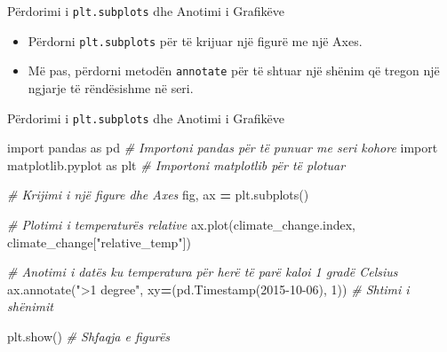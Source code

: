 \documentclass[
  ignorenonframetext,
]{beamer}
\newenvironment{Shaded}{\begin{snugshade}}{\end{snugshade}}
\newcommand{\CommentTok}[1]{\textcolor[rgb]{0.56,0.35,0.01}{\textit{#1}}}
\newcommand{\DecValTok}[1]{\textcolor[rgb]{0.00,0.00,0.81}{#1}}
\newcommand{\ImportTok}[1]{#1}
\newcommand{\NormalTok}[1]{#1}
\newcommand{\OperatorTok}[1]{\textcolor[rgb]{0.81,0.36,0.00}{\textbf{#1}}}
\newcommand{\StringTok}[1]{\textcolor[rgb]{0.31,0.60,0.02}{#1}}
\begin{document}
\begin{frame}[fragile]{Përdorimi i \texttt{plt.subplots} dhe Anotimi i
Grafikëve}
\protect\hypertarget{puxebrdorimi-i-plt.subplots-dhe-anotimi-i-grafikuxebve}{}
\begin{itemize}
\item
  Përdorni \texttt{plt.subplots} për të krijuar një figurë me një Axes.
\item
  Më pas, përdorni metodën \texttt{annotate} për të shtuar një shënim që
  tregon një ngjarje të rëndësishme në seri.
\end{itemize}
\end{frame}

\begin{frame}[fragile]{Përdorimi i \texttt{plt.subplots} dhe Anotimi i
Grafikëve}
\protect\hypertarget{puxebrdorimi-i-plt.subplots-dhe-anotimi-i-grafikuxebve-1}{}

\begin{Shaded}
\begin{Highlighting}[]
\ImportTok{import}\NormalTok{ pandas }\ImportTok{as}\NormalTok{ pd  }\CommentTok{\# Importoni pandas për të punuar me seri kohore}
\ImportTok{import}\NormalTok{ matplotlib.pyplot }\ImportTok{as}\NormalTok{ plt  }\CommentTok{\# Importoni matplotlib për të plotuar}

\CommentTok{\# Krijimi i një figure dhe Axes}
\NormalTok{fig, ax }\OperatorTok{=}\NormalTok{ plt.subplots()}

\CommentTok{\# Plotimi i temperaturës relative}
\NormalTok{ax.plot(climate\_change.index, climate\_change[}\StringTok{"relative\_temp"}\NormalTok{])}

\CommentTok{\# Anotimi i datës ku temperatura për herë të parë kaloi 1 gradë Celsius}
\NormalTok{ax.annotate(}\StringTok{"\textgreater{}1 degree"}\NormalTok{, xy}\OperatorTok{=}\NormalTok{(pd.Timestamp(}\StringTok{\textquotesingle{}2015{-}10{-}06\textquotesingle{}}\NormalTok{), }\DecValTok{1}\NormalTok{))  }\CommentTok{\# Shtimi i shënimit}

\NormalTok{plt.show()  }\CommentTok{\# Shfaqja e figurës}
\end{Highlighting}
\end{Shaded}
\end{frame}
\end{document}
